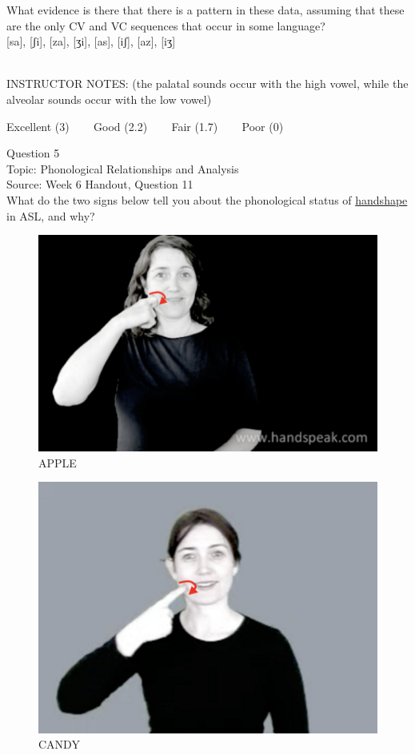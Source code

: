 \documentclass[12pt]{article}
\begin{document}
What evidence is there that there is a pattern in these data, assuming that these are the only CV and VC sequences that occur in some language?\\

{[sa]}, {[ʃi]}, {[za]}, {[ʒi]}, {[as]}, {[iʃ]}, {[az]}, {[iʒ]}


~\\
INSTRUCTOR NOTES: (the palatal sounds occur with the high vowel, while the alveolar sounds occur with the low vowel)


\vfill
Excellent (3) ~~~ Good (2.2) ~~~ Fair (1.7) ~~~ Poor (0)
\newpage

{\large Question 5}\\

Topic: Phonological Relationships and Analysis\\
Source: Week 6 Handout, Question 11\\

What do the two signs below tell you about the phonological status of \underline{handshape} in ASL, and why?\\

\begin{figure}[H]
\includegraphics{../images/asl_apple.png}
\caption{APPLE}
\end{figure}
\begin{figure}[H]
\includegraphics{../images/asl_candy.png}
\caption{CANDY}
\end{figure}
\end{document}
